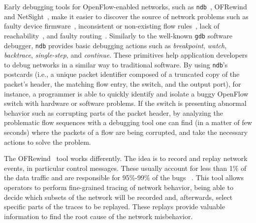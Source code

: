 Early debugging tools for OpenFlow-enabled networks, such as \texttt{ndb}~\cite{handigol2012-1}, OFRewind~\cite{wundsam2011} and NetSight~\cite{handigol2014}, make it easier to discover the source of network problems such as faulty device firmware~\cite{handigol2012-1}, inconsistent or 
non-existing flow rules~\cite{handigol2012-1,wundsam2011}, lack of reachability~\cite{handigol2012-1,wundsam2011}, and faulty routing~\cite{handigol2012-1,wundsam2011}.
Similarly to the well-known \texttt{gdb} software debugger, \texttt{ndb} provides basic debugging 
actions such as \textit{breakpoint}, \textit{watch}, \textit{backtrace}, \textit{single-step}, and 
\textit{continue}. These primitives help application developers to debug networks in a similar way 
to traditional software.
By using \texttt{ndb}'s postcards (i.e., a unique packet identifier composed of a truncated copy of the packet's header, the matching flow entry, the switch, and the output port), for instance, a programmer is able to quickly identify 
and isolate a buggy OpenFlow switch with hardware or software problems. 
If the switch is 
presenting abnormal behavior such as corrupting parts of the packet header, by 
analyzing the problematic flow sequences with a debugging tool one can find (in a matter of few seconds) where 
the packets of a flow are being corrupted, and take the necessary actions to solve the problem.

The OFRewind~\cite{wundsam2011} tool works differently. The idea is to record and 
replay network events, in particular control messages.
These usually account for less than 1\% of the data 
traffic and are responsible for 95\%-99\% of the bugs ~\cite{altekar2010}. 
This tool allows operators to 
perform fine-grained tracing of network behavior, being able to decide which subsets of the network will 
be recorded and, afterwards, select specific parts of the traces to be replayed. These replays provide 
valuable information to find the root cause of the network misbehavior.

